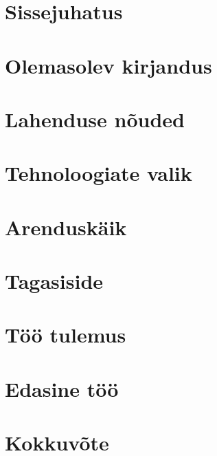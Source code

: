 \chapter{Sissejuhatus}


\chapter{Olemasolev kirjandus}


\chapter{Lahenduse nõuded}\label{ch:requirements}


\chapter{Tehnoloogiate valik}


\chapter{Arenduskäik}


\chapter{Tagasiside}


\chapter{Töö tulemus}


\chapter{Edasine töö}


\chapter{Kokkuvõte}


